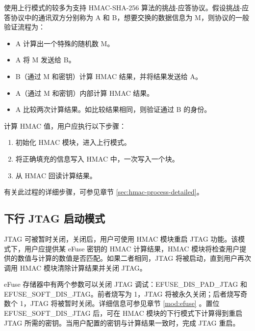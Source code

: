 \documentclass[main\_\_CN.tex]{subfiles}
\begin{document}
使用上行模式的较多为支持 HMAC-SHA-256 算法的挑战-应答协议。假设挑战-应答协议中的通讯双方分别称为 A 和 B，想要交换的数据信息为 M，则协议的一般验证流程为：

\begin{itemize}
    \item A 计算出一个特殊的随机数 M。
    \item A 将 M 发送给 B。
    \item B（通过 M 和密钥）计算 HMAC 结果，并将结果发送给 A。
    \item A（通过 M 和密钥）内部计算 HMAC 结果。
    \item A 比较两次计算结果。如比较结果相同，则验证通过 B 的身份。
\end{itemize}

计算 HMAC 值，用户应执行以下步骤：

\begin{enumerate}
    \item 初始化 HMAC 模块，进入上行模式。
    \item 将正确填充的信息写入 HMAC 中，一次写入一个块。
    \item 从 HMAC 回读计算结果。
\end{enumerate}

有关此过程的详细步骤，可参见章节 \ref{sec:hmac-process-detailed}。

\subsection{下行 JTAG 启动模式}

JTAG 可被暂时关闭，关闭后，用户可使用 HMAC 模块重启 JTAG 功能。该模式下，用户应提供某 eFuse 密钥的 HMAC 计算结果，HMAC 模块将检查用户提供的数值与计算的数值是否匹配。如果二者相同，JTAG 将被启动，直到用户再次调用 HMAC 模块清除计算结果并关闭 JTAG。

eFuse 存储器中有两个参数可以关闭 JTAG 调试：EFUSE\_DIS\_PAD\_JTAG 和 EFUSE\_SOFT\_DIS\_JTAG。前者烧写为 1，JTAG 将被永久关闭；后者烧写奇数个 1，JTAG 将被暂时关闭。详细信息可参见章节 \ref{mod:efuse} \textit{}。置位 EFUSE\_SOFT\_DIS\_JTAG 后，可在 HMAC 模块的下行模式下计算得到重启 JTAG 所需的密钥。当用户配置的密钥与计算结果一致时，完成 JTAG 重启。
\end{document}
